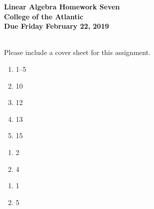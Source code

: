 \documentclass[11pt]{article}
\begin{document}
\pagestyle{empty}
 
\begin{center}
{\Large {\bf Linear Algebra Homework Seven}}\\
\medskip
{\large {\bf College of the Atlantic}}\\
\medskip
{\large {\bf Due Friday February 22, 2019}}\\
\medskip
\end{center}

\\


\noindent Please include a cover sheet for this assignment.\\

\begin{enumerate}
\setlength{\itemsep}{-1mm}
\item 1--5
\item 10
\item 12
\item 13
\item 15
\end{enumerate}


\begin{enumerate}
\setlength{\itemsep}{-1mm}
\item 2
\item 4
\end{enumerate}


\begin{enumerate}
\setlength{\itemsep}{-1mm}
\item 1
\item 5
\end{enumerate}
\end{document}
